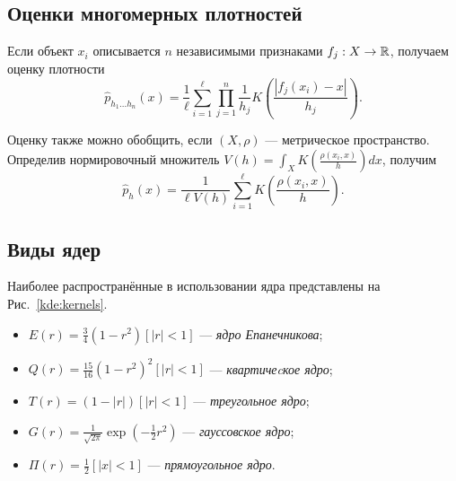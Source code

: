 {\subsection*{Оценки многомерных плотностей}
Если объект $x_i$ описывается $n$ независимыми признаками $f_j: X \to \mathbb{R}$,
получаем оценку плотности
\begin{equation}
\hat{p}_{h_1 \ldots h_n}(x)
  = \frac{1}{\ell}\sum_{i = 1}^\ell
    \prod_{j = 1}^n \frac{1}{h_j} K\left(\frac{|f_j(x_i) - x|}{h_j}\right).
\label{kde:features}
\end{equation}

Оценку также можно обобщить, если $ (X, \rho) $ --- метрическое пространство.
Определив нормировочный множитель
$V(h) = \int_X K\left(\frac{\rho(x_i, x)}{h}\right) dx$, получим
\begin{equation}
\hat{p}_h(x)
  = \frac{1}{\ell V(h)}\sum_{i = 1}^\ell K\left(\frac{\rho(x_i, x)}{h}\right).
\label{kde:metric}
\end{equation}
\subsection*{Виды ядер}

Наиболее распространённые в использовании ядра представлены на Рис.~\ref{kde:kernels}.
\begin{itemize}
\item $E(r) = \frac{3}{4}(1 - r^2)[|r| < 1]$ --- \emph{ядро Епанечникова};
\item $Q(r) = \frac{15}{16}(1 - r^2)^2 [|r| < 1]$ --- \emph{квартичеcкое ядро};
\item $T(r) = (1 - |r|) [|r| < 1]$ --- \emph{треугольное ядро};
\item $G(r) = \frac{1}{\sqrt{2\pi}} \exp(-\frac{1}{2} r^2)$ --- \emph{гауссовское ядро};
\item $\Pi(r) = \frac{1}{2} [|x| < 1]$ --- \emph{прямоугольное ядро}.
\end{itemize}

\begin{figure}[h]
\centering
{}
\end{figure}}
